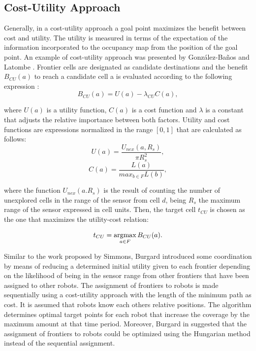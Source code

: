\subsection{Cost-Utility Approach}

Generally, in a cost-utility approach a goal point maximizes the benefit between cost and utility. The utility is measured in terms of the expectation of the information incorporated to the occupancy map from the position of the goal point. An example of cost-utility approach was presented by González-Baños and Latombe \cite{GonzlezBaos2002}. Frontier cells are designated as candidate destinations and the benefit $B_{CU}(a)$ to reach a candidate cell a is evaluated according to the following expression \cite{Julia2012}:
\begin{equation}
B_{CU}(a) = U(a) - \lambda_{CU}C(a),
\label{equation:cost-utility}
\end{equation}

where $U(a)$ is a utility function, $C(a)$ is a cost function and $\lambda$ is a constant that adjusts the relative importance between both factors. Utility and cost functions are expressions normalized in the range $\left[0, 1\right]$ that are calculated as follows:
\begin{equation}
U(a) = \frac{U_{nex}(a, R_{s})}{\pi R_{s}^{2}},
\end{equation}
\begin{equation}
C(a) = \frac{L(a)}{max_{b \in F}L(b)},
\end{equation}

where the function $U_{nex}(a. R_{s})$ is the result of counting the number of unexplored cells in the range of the sensor from cell $d$, being $R_{s}$ the maximum range of the sensor expressed in cell units.
Then, the target cell $t_{CU}$ is chosen as the one that maximizes the utility-cost relation:

\begin{equation}
t_{CU} = \operatorname*{argmax}_{a \in F} B_{CU}(a).
\end{equation}

Similar to the work proposed by Simmons, Burgard \cite{Burgard2000} introduced some coordination by means of reducing a determined initial utility given to each frontier depending on the likelihood of being in the sensor range from other frontiers that have been assigned to other robots. The assignment of frontiers to robots is made sequentially using a cost-utility approach with the length of the minimum path as cost. It is assumed that robots know each others relative positions. The algorithm determines optimal target points for each robot that increase the coverage by the maximum amount at that time period. Moreover, Burgard in \cite{Burgard2005} suggested that the assignment of frontiers to robots could be optimized using the Hungarian method \cite{Kuhn1955} instead of the sequential assignment.

